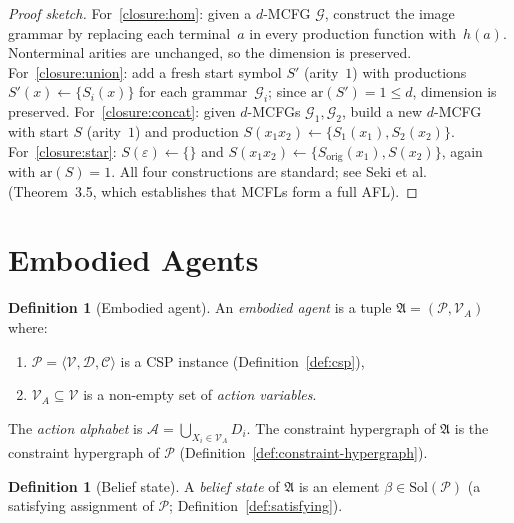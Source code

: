 \documentclass[11pt,a4paper]{article}
\theoremstyle{plain}
\theoremstyle{definition}
\newtheorem{definition}[theorem]{Definition}
\theoremstyle{remark}
\begin{document}
\begin{proof}[Proof sketch]
For~\ref{closure:hom}: given a $d$-MCFG $\mathcal{G}$, construct the image grammar by replacing each terminal~$a$ in every production function with~$h(a)$.
Nonterminal arities are unchanged, so the dimension is preserved.
For~\ref{closure:union}: add a fresh start symbol $S'$ (arity~$1$) with productions $S'(x) \leftarrow \{S_i(x)\}$ for each grammar~$\mathcal{G}_i$; since $\mathrm{ar}(S') = 1 \leq d$, dimension is preserved.
For~\ref{closure:concat}: given $d$-MCFGs $\mathcal{G}_1, \mathcal{G}_2$, build a new $d$-MCFG with start $S$ (arity~$1$) and production $S(x_1 x_2) \leftarrow \{S_1(x_1), S_2(x_2)\}$.
For~\ref{closure:star}: $S(\varepsilon) \leftarrow \{\}$ and $S(x_1 x_2) \leftarrow \{S_{\mathrm{orig}}(x_1), S(x_2)\}$, again with $\mathrm{ar}(S) = 1$.
All four constructions are standard; see Seki et al.~\cite{Seki91} (Theorem~3.5, which establishes that MCFLs form a full AFL).
\end{proof}

\section{Embodied Agents}\label{sec:agent}

\begin{definition}[Embodied agent]\label{def:agent}
An \emph{embodied agent} is a tuple $\mathfrak{A} = (\mathcal{P}, \mathcal{V}_A)$ where:
\begin{enumerate}[nosep,label=(\roman*)]
  \item $\mathcal{P} = \langle \mathcal{V}, \mathcal{D}, \mathcal{C} \rangle$ is a CSP instance (Definition~\ref{def:csp}),
  \item $\mathcal{V}_A \subseteq \mathcal{V}$ is a non-empty set of \emph{action variables}.
\end{enumerate}
The \emph{action alphabet} is $\mathcal{A} = \bigcup_{X_i \in \mathcal{V}_A} D_i$.
The constraint hypergraph of $\mathfrak{A}$ is the constraint hypergraph of $\mathcal{P}$ (Definition~\ref{def:constraint-hypergraph}).
\end{definition}

\begin{definition}[Belief state]\label{def:belief-state}
A \emph{belief state} of $\mathfrak{A}$ is an element $\beta \in \mathrm{Sol}(\mathcal{P})$ (a satisfying assignment of $\mathcal{P}$; Definition~\ref{def:satisfying}).
\end{definition}
\end{document}
